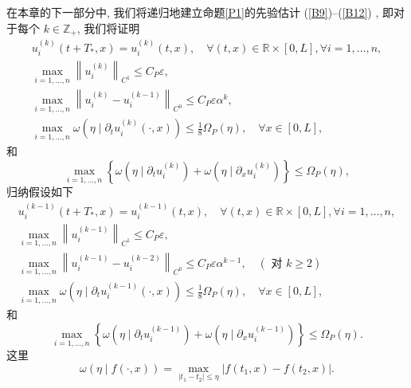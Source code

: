 \documentclass[notitlepage,cs4size,punct,oneside]{ctexrep}
\numberwithin{equation}{chapter}
\theoremstyle{mystyle}
\begin{document}
在本章的下一部分中, 我们将递归地建立命题\ref{P1}的先验估计 (\ref{B9})--(\ref{B12}) , 即对于每个 $k \in \mathbb{Z}_{+}$, 我们将证明
\begin{gather}
    u_{i}^{(k)}\left(t+T_{*}, x\right)=u_{i}^{(k)}(t, x), \quad \forall(t, x) \in \mathbb{R} \times[0, L], \forall i=1, \ldots, n, \label{B15} \\
    \max _{i=1, \ldots, n}\left\|u_{i}^{(k)}\right\|_{C^{1}} \leq C_{P} \varepsilon, \label{B16}\\
    \max _{i=1, \ldots, n}\left\|u_{i}^{(k)}-u_{i}^{(k-1)}\right\|_{C^{0}} \leq C_{P} \varepsilon \alpha^{k}, \label{B17}\\
    \max _{i=1, \ldots, n} \omega\left(\eta \mid \partial_{t} u_{i}^{(k)}(\cdot, x)\right) \leq \frac{1}{8} \Omega_{P}(\eta), \quad \forall x \in[0, L] \label{B18},
\end{gather}
和
\begin{equation}\label{B19}
    \max _{i=1, \ldots, n}\left\{\omega\left(\eta \mid \partial_{t} u_{i}^{(k)}\right)+\omega\left(\eta \mid \partial_{x} u_{i}^{(k)}\right)\right\} \leq \Omega_{P}(\eta),
\end{equation}
归纳假设如下
\begin{gather}
    u_{i}^{(k-1)}\left(t+T_{*}, x\right)=u_{i}^{(k-1)}(t, x), \quad \forall(t, x) \in \mathbb{R} \times[0, L], \forall i=1, \ldots, n, \label{B20} \\
    \max _{i=1, \ldots, n}\left\|u_{i}^{(k-1)}\right\|_{C^{1}} \leq C_{P} \varepsilon,  \label{B21} \\
    \max _{i=1, \ldots, n}\left\|u_{i}^{(k-1)}-u_{i}^{(k-2)}\right\|_{C^{0}} \leq C_{P} \varepsilon \alpha^{k-1}, \quad(\text { 对 } k \geq 2)  \label{B22} \\
    \max _{i=1, \ldots, n} \omega\left(\eta \mid \partial_{t} u_{i}^{(k-1)}(\cdot, x)\right) \leq \frac{1}{8} \Omega_{P}(\eta), \quad \forall x \in[0, L] ,\label{B23}
\end{gather}
和
\begin{equation} \label{B24}
    \max _{i=1, \ldots, n}\left\{\omega\left(\eta \mid \partial_{t} u_{i}^{(k-1)}\right)+\omega\left(\eta \mid \partial_{x} u_{i}^{(k-1)}\right)\right\} \leq \Omega_{P}(\eta).
\end{equation}
这里
\begin{equation} \label{B25}
    \omega(\eta \mid f(\cdot, x))=\max _{\left|t_{1}-t_{2}\right| \leq \eta}\left|f\left(t_{1}, x\right)-f\left(t_{2}, x\right)\right| .
\end{equation}
\end{document}
